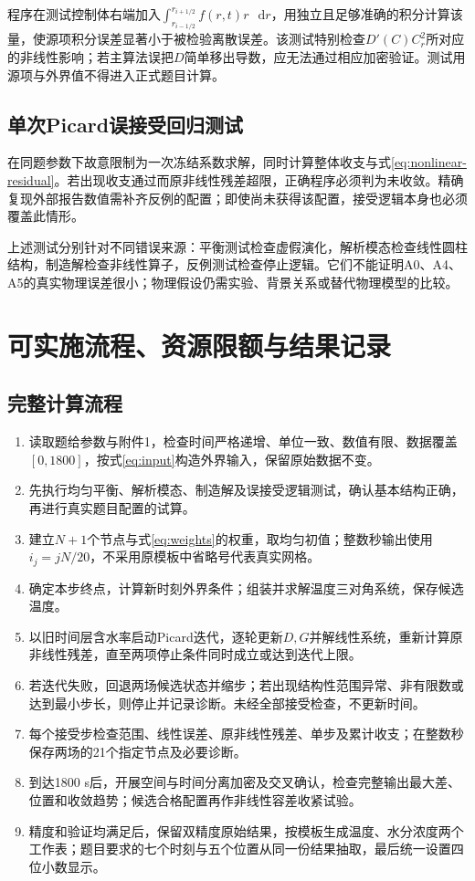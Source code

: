 \documentclass[UTF8,a4paper,zihao=-4,fontset=none]{ctexart}
\numberwithin{equation}{section}
\newcommand{\dd}{\mathop{}\!\mathrm d}
\begin{document}
程序在测试控制体右端加入$\int_{r_{i-1/2}}^{r_{i+1/2}}f(r,t)r\,\dd r$，用独立且足够准确的积分计算该量，使源项积分误差显著小于被检验离散误差。该测试特别检查$D'(C)C_r^2$所对应的非线性影响；若主算法误把$D$简单移出导数，应无法通过相应加密验证。测试用源项与外界值不得进入正式题目计算。

\subsection{单次Picard误接受回归测试}
在同题参数下故意限制为一次冻结系数求解，同时计算整体收支与式\eqref{eq:nonlinear-residual}。若出现收支通过而原非线性残差超限，正确程序必须判为未收敛。精确复现外部报告数值需补齐反例的配置；即使尚未获得该配置，接受逻辑本身也必须覆盖此情形。

上述测试分别针对不同错误来源：平衡测试检查虚假演化，解析模态检查线性圆柱结构，制造解检查非线性算子，反例测试检查停止逻辑。它们不能证明A0、A4、A5的真实物理误差很小；物理假设仍需实验、背景关系或替代物理模型的比较。

\section{可实施流程、资源限额与结果记录}
\subsection{完整计算流程}
\begin{enumerate}[label=\arabic*.]
\item 读取题给参数与附件1，检查时间严格递增、单位一致、数值有限、数据覆盖$[0,1800]$，按式\eqref{eq:input}构造外界输入，保留原始数据不变。
\item 先执行均匀平衡、解析模态、制造解及误接受逻辑测试，确认基本结构正确，再进行真实题目配置的试算。
\item 建立$N+1$个节点与式\eqref{eq:weights}的权重，取均匀初值；整数秒输出使用$i_j=jN/20$，不采用原模板中省略号代表真实网格。
\item 确定本步终点，计算新时刻外界条件；组装并求解温度三对角系统，保存候选温度。
\item 以旧时间层含水率启动Picard迭代，逐轮更新$D,G$并解线性系统，重新计算原非线性残差，直至两项停止条件同时成立或达到迭代上限。
\item 若迭代失败，回退两场候选状态并缩步；若出现结构性范围异常、非有限数或达到最小步长，则停止并记录诊断。未经全部接受检查，不更新时间。
\item 每个接受步检查范围、线性误差、原非线性残差、单步及累计收支；在整数秒保存两场的21个指定节点及必要诊断。
\item 到达1800 s后，开展空间与时间分离加密及交叉确认，检查完整输出最大差、位置和收敛趋势；候选合格配置再作非线性容差收紧试验。
\item 精度和验证均满足后，保留双精度原始结果，按模板生成温度、水分浓度两个工作表；题目要求的七个时刻与五个位置从同一份结果抽取，最后统一设置四位小数显示。
\end{enumerate}
\end{document}
